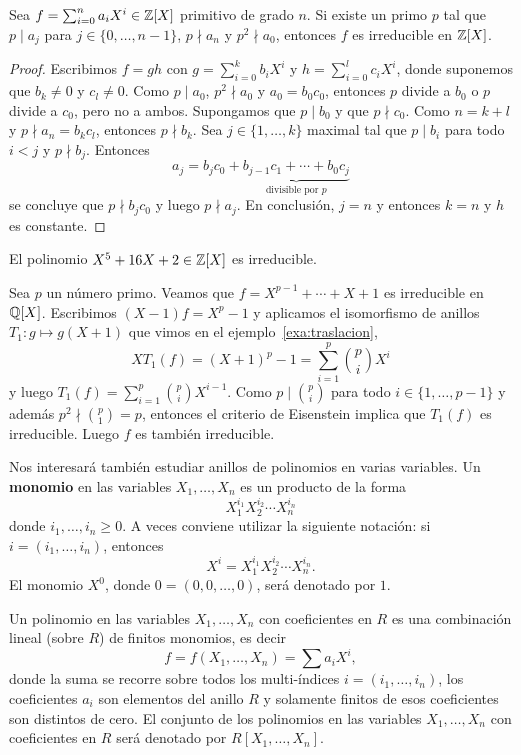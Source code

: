 \begin{theorem}[Eisenstein]
Sea $f=\sum_{i=0}^na_iX^i\in\mathbb{Z}[X]$ primitivo de grado $n$. Si existe un primo $p$ tal que
$p\mid a_j$ para $j\in\{0,\dots,n-1\}$, $p\nmid a_n$ y $p^2\nmid a_0$, entonces
$f$ es irreducible en $\mathbb{Z}[X]$.
\end{theorem}

\begin{proof}
Escribimos $f=gh$ con $g=\sum_{i=0}^kb_iX^i$ y $h=\sum_{i=0}^lc_iX^i$, donde suponemos que $b_k\ne 0$ y $c_l\ne 0$. 
Como $p\mid a_0$, $p^2\nmid a_0$ y $a_0=b_0c_0$, entonces $p$ divide a $b_0$ o $p$ divide a $c_0$, pero no a ambos. Supongamos que
$p\mid b_0$ y que $p\nmid c_0$. Como $n=k+l$ y $p\nmid a_n=b_kc_l$, entonces $p\nmid b_k$. Sea $j\in\{1,\dots,k\}$ maximal tal que
$p\mid b_i$ para todo $i<j$ y $p\nmid b_j$. Entonces
\[
a_j=b_jc_0+\underbrace{b_{j-1}c_1+\cdots+b_0c_j}_{\text{divisible por $p$}}
\]
se concluye que $p\nmid b_jc_0$ y luego $p\nmid a_j$. En conclusión, $j=n$ 
y entonces $k=n$ y $h$ es constante.
\end{proof}

\begin{example}
    El polinomio $X^5+16X+2\in\mathbb{Z}[X]$ es irreducible.
\end{example}

\begin{example}
Sea $p$ un número primo. Veamos que $f=X^{p-1}+\cdots+X+1$ es irreducible en $\mathbb{Q}[X]$. 
Escribimos $(X-1)f=X^p-1$ y aplicamos el isomorfismo de anillos 
$T_1\colon g\mapsto g(X+1)$ que vimos en el ejemplo~\ref{exa:traslacion}, 
\[
XT_1(f)=(X+1)^p-1=\sum_{i=1}^p\binom{p}{i}X^i
\]
y luego $T_1(f)=\sum_{i=1}^p\binom{p}{i}X^{i-1}$. Como $p\mid\binom{p}{i}$ para todo $i\in\{1,\dots,p-1\}$ y 
además $p^2\nmid \binom{p}{1}=p$, entonces el criterio de Eisenstein implica que $T_1(f)$ es irreducible. 
Luego $f$ es también irreducible. 
\end{example}

Nos interesará también estudiar anillos de polinomios en varias variables. Un \textbf{monomio} 
en las variables $X_1,\dots,X_n$ es un producto de la forma
\[
X_1^{i_1}X_2^{i_2}\cdots X_n^{i_n}
\]
donde $i_1,\dots,i_n\geq0$. A veces conviene utilizar la siguiente notación: si $i=(i_1,\dots,i_n)$, entonces 
\[
X^i=X_1^{i_1}X_2^{i_2}\cdots X_n^{i_n}.
\]  
El monomio $X^0$, donde $0=(0,0,\dots,0)$, será denotado por $1$. 

Un polinomio en las variables $X_1,\dots,X_n$ 
con coeficientes en $R$ es una combinación lineal (sobre $R$) de finitos 
monomios, es decir
\[
f=f(X_1,\dots,X_n)=\sum a_iX^i,
\]
donde la suma se recorre sobre todos los multi-índices $i=(i_1,\dots,i_n)$, los coeficientes $a_i$ son elementos del anillo $R$
y solamente finitos de esos coeficientes son distintos de cero. El conjunto de los polinomios en las variables
$X_1,\dots,X_n$ con coeficientes en $R$ será denotado por $R[X_1,\dots,X_n]$. 

